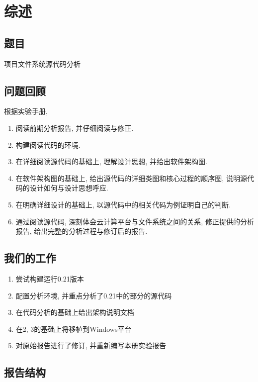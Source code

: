\chapter{综述}
\label{ch:intro}


\section{题目}

\Hadoop 项目文件系统源代码分析

\section{问题回顾}
\label{sec:intro:review}

根据实验手册, 

\begin{enumerate}
    \item 阅读前期分析报告, 并仔细阅读与修正.
    \item 构建阅读代码的环境.
    \item 在详细阅读源代码的基础上, 理解设计思想, 并给出软件架构图.
    \item 在软件架构图的基础上, 给出源代码的详细类图和核心过程的顺序图,
          说明源代码的设计如何与设计思想呼应.
    \item 在明确详细设计的基础上, 以源代码中的相关代码为例证明自己的判断.
    \item 通过阅读源代码, 深刻体会\Hadoop 云计算平台与文件系统之间的关系,
          修正提供的分析报告, 给出完整的分析过程与修订后的报告.
\end{enumerate}

\section{我们的工作}
\label{sec:intro:result}

\begin{enumerate}
    \item 尝试构建运行\Hadoop 0.21版本
    \item 配置分析环境, 并重点分析了\Hadoop 0.21中的\HadoopFS 部分的源代码
    \item 在代码分析的基础上给出架构说明文档
    \item 在2, 3的基础上将\HadoopFS 移植到Windows平台
    \item 对原始报告进行了修订, 并重新编写本册实验报告
\end{enumerate}

\section{报告结构}
\label{sec:intro:structure}

